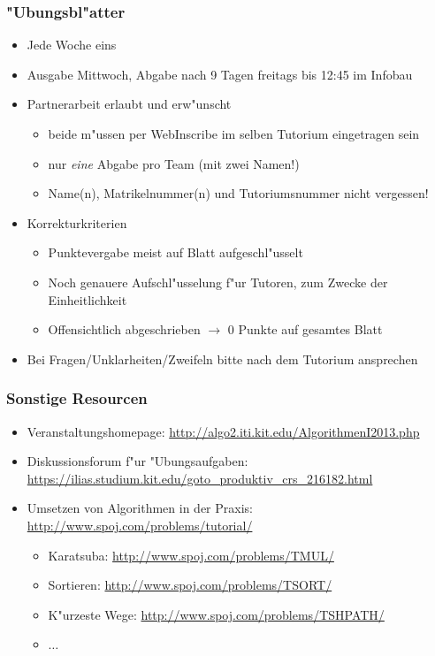 \documentclass[t]{beamer}
\begin{document}
\begin{frame}
  \frametitle{"Ubungsbl"atter}
  \begin{itemize}

  \item Jede Woche eins
  \item Ausgabe Mittwoch, Abgabe nach 9 Tagen freitags bis 12:45 im Infobau
  \item Partnerarbeit erlaubt und erw"unscht
    \begin{itemize}
    \item beide m"ussen per WebInscribe im selben Tutorium eingetragen sein
    \item nur \emph{eine} Abgabe pro Team (mit zwei Namen!)
    \item Name(n), Matrikelnummer(n) und Tutoriumsnummer nicht vergessen!
    \end{itemize}
  \item Korrekturkriterien
    \begin{itemize}
    \item Punktevergabe meist auf Blatt aufgeschl"usselt
    \item Noch genauere Aufschl"usselung f"ur Tutoren, zum Zwecke der Einheitlichkeit
    \item Offensichtlich abgeschrieben $\rightarrow$ 0 Punkte auf gesamtes Blatt
    \end{itemize}
  \item Bei Fragen/Unklarheiten/Zweifeln bitte nach dem Tutorium ansprechen

  \end{itemize}
\end{frame}

\begin{frame}
  \frametitle{Sonstige Resourcen}
  \begin{itemize}
  \item Veranstaltungshomepage: \url{http://algo2.iti.kit.edu/AlgorithmenI2013.php}
  \item Diskussionsforum f"ur "Ubungsaufgaben:
     \small \url{https://ilias.studium.kit.edu/goto_produktiv_crs_216182.html}
  \item Umsetzen von Algorithmen in der Praxis:
          \url{http://www.spoj.com/problems/tutorial/}
    \begin{itemize}
    \item Karatsuba: \url{http://www.spoj.com/problems/TMUL/}
    \item Sortieren: \url{http://www.spoj.com/problems/TSORT/}
    \item K"urzeste Wege: \url{http://www.spoj.com/problems/TSHPATH/}
    \item $\ldots$
    \end{itemize}
  \end{itemize}
\end{frame}
\end{document}
